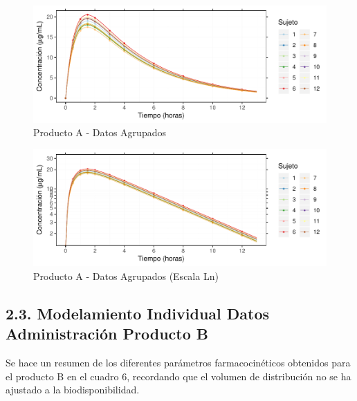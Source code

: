 \documentclass[]{article}
\begin{document}
\begin{figure}[H]

{\centering \includegraphics{parcial_1_files/figure-latex/unnamed-chunk-11-1} 

}

\caption{Producto A - Datos Agrupados}\label{fig:unnamed-chunk-11}
\end{figure}

\begin{figure}[H]

{\centering \includegraphics{parcial_1_files/figure-latex/unnamed-chunk-12-1} 

}

\caption{Producto A - Datos Agrupados (Escala Ln)}\label{fig:unnamed-chunk-12}
\end{figure}

\subsection{2.3. Modelamiento Individual Datos Administración Producto
B}\label{modelamiento-individual-datos-administracion-producto-b}

Se hace un resumen de los diferentes parámetros farmacocinéticos
obtenidos para el producto B en el cuadro 6, recordando que el volumen
de distribución no se ha ajustado a la biodisponibilidad.
\end{document}
